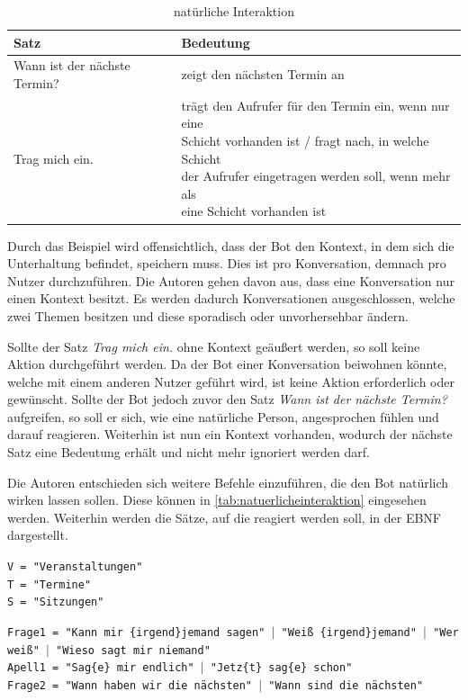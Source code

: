 \begin{table}[H]
\centering
\begin{tabular}{|l|l|}
\hline
\textbf{Satz} & \textbf{Bedeutung }\\
 \hline
Wann ist der nächste Termin? & zeigt den nächsten Termin an \\
\hline
Trag mich ein. & \makecell{trägt den Aufrufer für den Termin ein, wenn nur eine\\ Schicht vorhanden ist / fragt nach, in welche Schicht\\ der Aufrufer eingetragen werden soll, wenn mehr als\\ eine Schicht vorhanden ist} \\
\hline
\end{tabular}
\caption{natürliche Interaktion}
\label{tab:satzinteraktion}
\end{table}

Durch das Beispiel wird offensichtlich, dass der Bot den Kontext, in dem sich die Unterhaltung befindet, speichern muss. Dies ist pro Konversation, demnach pro Nutzer durchzuführen. Die Autoren gehen davon aus, dass eine Konversation nur einen Kontext besitzt. Es werden dadurch Konversationen ausgeschlossen, welche zwei Themen besitzen und diese sporadisch oder unvorhersehbar ändern.

Sollte der Satz \textit{Trag mich ein.} ohne Kontext geäußert werden, so soll keine Aktion durchgeführt werden. Da der Bot einer Konversation beiwohnen könnte, welche mit einem anderen Nutzer geführt wird, ist keine Aktion erforderlich oder gewünscht. Sollte der Bot jedoch zuvor den Satz \textit{Wann ist der nächste Termin?} aufgreifen, so soll er sich, wie eine natürliche Person, angesprochen fühlen und darauf reagieren. Weiterhin ist nun ein Kontext vorhanden, wodurch der nächste Satz eine Bedeutung erhält und nicht mehr ignoriert werden darf.


Die Autoren entschieden sich weitere Befehle einzuführen, die den Bot natürlich wirken lassen sollen. Diese können in \autoref{tab:natuerlicheinteraktion} eingesehen werden. Weiterhin werden die Sätze, auf die reagiert werden soll, in der EBNF dargestellt.

\texttt{V = "Veranstaltungen"}\\
\texttt{T = "Termine"}\\
\texttt{S = "{}Sitzungen"}

\texttt{Frage1 = "Kann mir \{irgend\}jemand sagen" $|$ "Weiß \{irgend\}jemand" $|$ "Wer weiß" $|$ "Wieso sagt mir niemand"}\\
\texttt{Apell1 = "{}Sag\{e\} mir endlich" $|$ "Jetz\{t\} sag\{e\} schon"}\\
\texttt{Frage2 = "Wann haben wir die nächsten" $|$ "Wann sind die nächsten"}


